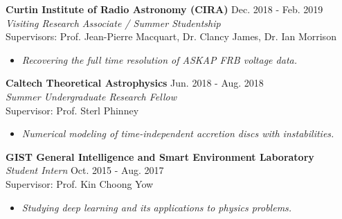 \documentclass[margin, 10pt]{res} %
\begin{document}
\begin{resume}
{\bf Curtin Institute of Radio Astronomy (CIRA)} \hfill Dec. 2018 - Feb. 2019 \\
{\sl Visiting Research Associate / Summer Studentship} \\
Supervisors: Prof. Jean-Pierre Macquart, Dr. Clancy James, Dr. Ian Morrison
\begin{itemize}
\item[] {\sl Recovering the full time resolution of ASKAP FRB voltage data.}%
\end{itemize} 

{\bf Caltech Theoretical Astrophysics} \hfill Jun. 2018 - Aug. 2018 \\
{\sl Summer Undergraduate Research Fellow} \\
Supervisor: Prof. Sterl Phinney
\begin{itemize}
\item[] {\sl Numerical modeling of time-independent accretion discs with instabilities.}%
\end{itemize} 

{\bf GIST General Intelligence and Smart Environment Laboratory}\\
{\sl Student Intern} \hfill Oct. 2015 - Aug. 2017 \\
Supervisor: Prof. Kin Choong Yow
\begin{itemize}
\item[] {\sl Studying deep learning and its applications to physics problems.}%
\end{itemize} 


\end{resume}
\end{document}
